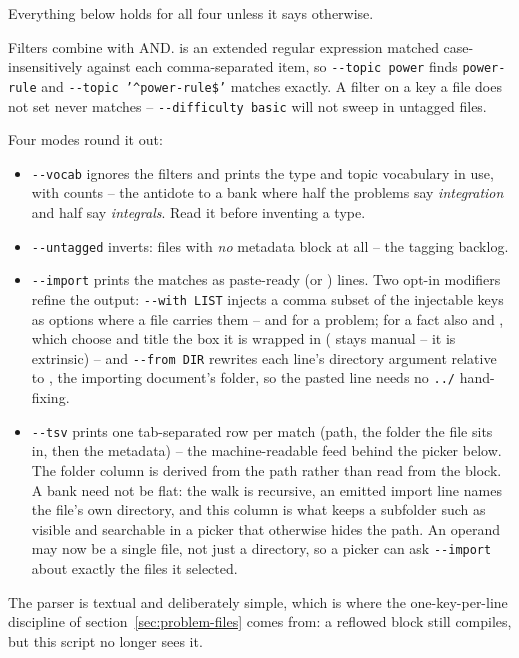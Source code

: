 Everything below holds for all four unless it says otherwise.

Filters combine with AND.  is an extended regular
expression matched case-insensitively against each comma-separated item, so
\texttt{-{}-topic power} finds \texttt{power-rule} and
\texttt{-{}-topic '\^{}power-rule\$'} matches exactly. A filter on a key a
file does not set never matches -- \texttt{-{}-difficulty basic} will not
sweep in untagged files.

Four modes round it out:

\begin{itemize}
  \item \texttt{-{}-vocab} ignores the filters and prints the type and topic
    vocabulary in use, with counts -- the antidote to a bank where half the
    problems say \emph{integration} and half say \emph{integrals}. Read it
    before inventing a type.
  \item \texttt{-{}-untagged} inverts: files with \emph{no} metadata block
    at all -- the tagging backlog.
  \item \texttt{-{}-import} prints the matches as paste-ready
     (or ) lines. Two opt-in modifiers
    refine the output:
    \texttt{-{}-with LIST} injects a comma subset of the injectable keys as
    options where a file carries them --  and  for a
    problem; for a fact also  and , which choose and
    title the box it is wrapped in ( stays manual --
    it is extrinsic) -- and \texttt{-{}-from DIR} rewrites each line's directory
    argument relative to , the importing document's folder, so the
    pasted line needs no \texttt{../} hand-fixing.
  \item \texttt{-{}-tsv} prints one tab-separated row per match (path, the
    folder the file sits in, then the metadata) -- the machine-readable feed
    behind the picker below. The folder column is derived from the path rather
    than read from the block. A bank need not be flat: the walk is recursive,
    an emitted import line names the file's own directory, and this column is
    what keeps a subfolder such as  visible
    and searchable in a picker that otherwise hides the path. An operand
    may now be a single  file, not just a directory, so a picker can
    ask \texttt{-{}-import} about exactly the files it selected.
\end{itemize}

The parser is textual and deliberately simple, which is where the
one-key-per-line discipline of section~\ref{sec:problem-files} comes from:
a reflowed block still compiles, but this script no longer sees it.

